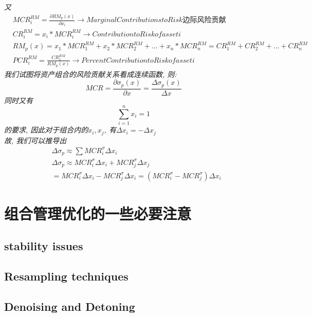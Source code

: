 \documentclass{scrartcl}
\numberwithin{equation}{section}
\begin{document}
\textsl{又}
\begin{equation}
    \begin{aligned}
         & MCR_i^{RM} = \frac{\partial RM_p(x)}{\partial x_i} \rightarrow Marginal Contributions to Risk 边际风险贡献            \\
         & CR_i^{RM} = x_i * MCR_i^{RM} \rightarrow Contribution to Risk of asset i                                              \\
         & RM_p(x) = x_1 * MCR_1^{RM} + x_2 * MCR_2^{RM} + \dots +  x_n * MCR_n^{RM} = CR_1^{RM} + CR_2^{RM} + \dots + CR_n^{RM} \\
         & PCR_i^{RM} = \frac{CR_1^{RM}}{RM_{p}(x)} \rightarrow Percent Contribution to Risk of asset i
    \end{aligned}
\end{equation}
\textsl{我们试图将资产组合的风险贡献关系看成连续函数, 则: $$MCR =  \frac{\partial \sigma_p(x)}{\partial x}
    = \frac{\Delta \sigma_p(x)}{\Delta x} $$同时又有 $$\sum_{i=1}^n{x_i} = 1$$的要求, 因此对于组合内的$x_i, x_j$, 有$\Delta{x_i} = - \Delta {x_j}$
\\ 故, 我们可以推导出}
\begin{equation}
    \begin{aligned}
         & \Delta{\sigma_p} \approx \sum MCR_i^{\sigma} \Delta x_i                                                   \\
         & \Delta {\sigma_p} \approx MCR_i^{\sigma} \Delta x_i +   MCR_j^{\sigma} \Delta x_j                         \\
         & = MCR_i^{\sigma} \Delta x_i -   MCR_j^{\sigma} \Delta x_i = (MCR_i^{\sigma} -  MCR_j^{\sigma}) \Delta x_i
    \end{aligned}
\end{equation}


\newpage

\section{组合管理优化的一些必要注意}
\subsection{stability issues}
\subsection{Resampling techniques}
\subsection{Denoising and Detoning}
\end{document}
